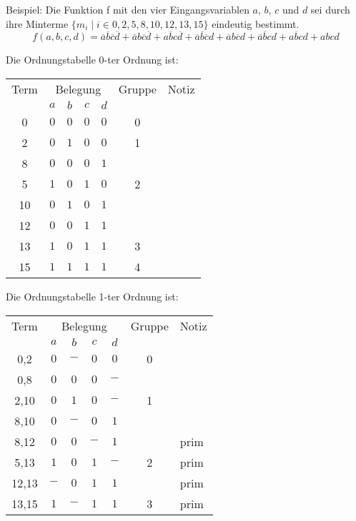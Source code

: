 Beispiel: Die Funktion f mit den vier Eingangsvariablen $a$, $b$, $c$ und $d$ sei durch ihre Minterme $\{m_i \mid i \in {0,2,5,8,10,12,13,15}\}$ eindeutig bestimmt.
$$ f(a,b,c,d) = \overline{a}\overline{b}\overline{c}\overline{d} + \overline{a}b\overline{c}\overline{d} + a\overline{b}c\overline{d} + \overline{a}\overline{b}\overline{c}d + \overline{a}b\overline{c}d + \overline{a}\overline{b}cd + a\overline{b}cd + abcd$$
\begin{center}
Die Ordnungstabelle 0-ter Ordnung ist:

\begin{tabular}{c *{4}{c} c l}
Term & \multicolumn{4}{c}{Belegung} & Gruppe & Notiz \\
     & $a$ & $b$ & $c$ & $d$        &        &       \\ \hline
 0   & $0$ & $0$ & $0$ & $0$        & 0      &       \\ \hline
 2   & $0$ & $1$ & $0$ & $0$        & 1      &       \\
 8   & $0$ & $0$ & $0$ & $1$        &        &       \\ \hline
 5   & $1$ & $0$ & $1$ & $0$        & 2      &       \\
10   & $0$ & $1$ & $0$ & $1$        &        &       \\
12   & $0$ & $0$ & $1$ & $1$        &        &       \\ \hline
13   & $1$ & $0$ & $1$ & $1$        & 3      &       \\ \hline
15   & $1$ & $1$ & $1$ & $1$        & 4      &       \\
\end{tabular} 
\end{center}

\begin{center}
Die Ordnungstabelle 1-ter Ordnung ist:

\begin{tabular}{c *{4}{c} c l}
Term  & \multicolumn{4}{c}{Belegung} & Gruppe & Notiz \\
      & $a$ & $b$ & $c$ & $d$        &        &       \\ \hline
 0,2  & $0$ & $-$ & $0$ & $0$        & 0      &       \\ 
 0,8  & $0$ & $0$ & $0$ & $-$        &        &       \\ \hline
 2,10 & $0$ & $1$ & $0$ & $-$        & 1      &       \\ 
 8,10 & $0$ & $-$ & $0$ & $1$        &        &       \\
 8,12 & $0$ & $0$ & $-$ & $1$        &        & prim  \\ \hline
 5,13 & $1$ & $0$ & $1$ & $-$        & 2      & prim  \\ 
12,13 & $-$ & $0$ & $1$ & $1$        &        & prim  \\ \hline
13,15 & $1$ & $-$ & $1$ & $1$        & 3      & prim  \\
\end{tabular} 
\end{center}

